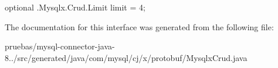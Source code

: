 {\ttfamily optional .Mysqlx.\+Crud.\+Limit limit = 4;} 

The documentation for this interface was generated from the following file\+:\begin{DoxyCompactItemize}
\item 
pruebas/mysql-\/connector-\/java-\/8../src/generated/java/com/mysql/cj/x/protobuf/Mysqlx\+Crud.\+java\end{DoxyCompactItemize}
